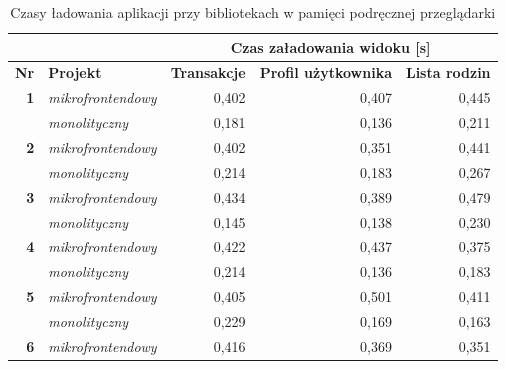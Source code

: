 \documentclass{SGGW-thesis}
\begin{document}
    \vfill

    \begin{table}[]
      \centering
      \caption{Czasy ładowania aplikacji przy bibliotekach w pamięci podręcznej przeglądarki}
      \begin{tabular}{ll|rrr|}
      \cline{3-5}
       &  & \multicolumn{3}{c|}{\textbf{Czas załadowania widoku {[}s{]}}} \\ \hline
      \multicolumn{1}{|l|}{\textbf{Nr}} & \textbf{Projekt} & \multicolumn{1}{l|}{\textbf{Transakcje}} & \multicolumn{1}{l|}{\textbf{Profil użytkownika}} & \multicolumn{1}{l|}{\textbf{Lista rodzin}} \\ \hline
      \multicolumn{1}{|r|}{\textbf{1}} & \textit{mikrofrontendowy} & \multicolumn{1}{r|}{0,402} & \multicolumn{1}{r|}{0,407} & 0,445 \\ \hline
      \multicolumn{1}{|l|}{\textbf{}} & \textit{monolityczny} & \multicolumn{1}{r|}{0,181} & \multicolumn{1}{r|}{0,136} & 0,211 \\ \hline
      \multicolumn{1}{|r|}{\textbf{2}} & \textit{mikrofrontendowy} & \multicolumn{1}{r|}{0,402} & \multicolumn{1}{r|}{0,351} & 0,441 \\ \hline
      \multicolumn{1}{|l|}{\textbf{}} & \textit{monolityczny} & \multicolumn{1}{r|}{0,214} & \multicolumn{1}{r|}{0,183} & 0,267 \\ \hline
      \multicolumn{1}{|r|}{\textbf{3}} & \textit{mikrofrontendowy} & \multicolumn{1}{r|}{0,434} & \multicolumn{1}{r|}{0,389} & 0,479 \\ \hline
      \multicolumn{1}{|l|}{\textbf{}} & \textit{monolityczny} & \multicolumn{1}{r|}{0,145} & \multicolumn{1}{r|}{0,138} & 0,230 \\ \hline
      \multicolumn{1}{|r|}{\textbf{4}} & \textit{mikrofrontendowy} & \multicolumn{1}{r|}{0,422} & \multicolumn{1}{r|}{0,437} & 0,375 \\ \hline
      \multicolumn{1}{|l|}{\textbf{}} & \textit{monolityczny} & \multicolumn{1}{r|}{0,214} & \multicolumn{1}{r|}{0,136} & 0,183 \\ \hline
      \multicolumn{1}{|r|}{\textbf{5}} & \textit{mikrofrontendowy} & \multicolumn{1}{r|}{0,405} & \multicolumn{1}{r|}{0,501} & 0,411 \\ \hline
      \multicolumn{1}{|l|}{\textbf{}} & \textit{monolityczny} & \multicolumn{1}{r|}{0,229} & \multicolumn{1}{r|}{0,169} & 0,163 \\ \hline
      \multicolumn{1}{|r|}{\textbf{6}} & \textit{mikrofrontendowy} & \multicolumn{1}{r|}{0,416} & \multicolumn{1}{r|}{0,369} & 0,351 \\ \hline

\end{tabular}
\end{table}
\end{document}
